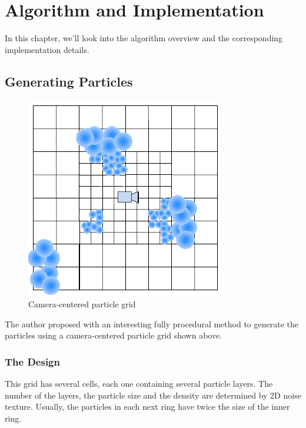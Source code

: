 \chapter{Algorithm and Implementation}
In this chapter, we'll look into the algorithm overview and the corresponding implementation details.

\section{Generating Particles}
\begin{figure}[htp]
\begin{center}
\includegraphics[scale=0.5]{images/particlegrid.png}
\caption{Camera-centered particle grid}
\label{f13}
\end{center}
\end{figure}

The author proposed with an interesting fully procedural method to generate the particles using a camera-centered particle grid shown above. 
\subsection{The Design}
This grid has several cells, each one containing several particle layers. The number of the layers, the particle size and the density are determined by 2D noise texture. Usually, the particles in each next ring have twice the size of the inner ring.\\\\\\\\

